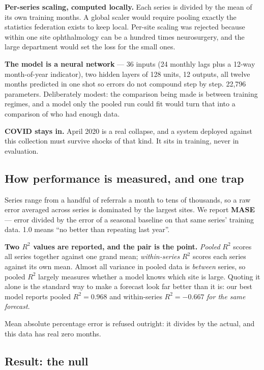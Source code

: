 \documentclass[11pt,a4paper]{article}
\newcommand{\keypoint}[1]{%
  \par\vspace{0.4em}%
  \noindent\colorbox{fed!8}{\parbox{0.98\textwidth}{\vspace{0.2em}#1\vspace{0.2em}}}%
  \par\vspace{0.4em}}
\begin{document}
\textbf{Per-series scaling, computed locally.} Each series is divided by the mean of its own training
months. A global scaler would require pooling exactly the statistics federation exists to keep local.
Per-site scaling was rejected because within one site ophthalmology can be a hundred times
neurosurgery, and the large department would set the loss for the small ones.

\textbf{The model is a neural network} --- 36 inputs (24 monthly lags plus a 12-way month-of-year
indicator), two hidden layers of 128 units, 12 outputs, all twelve months predicted in one shot so
errors do not compound step by step. 22{,}796 parameters. Deliberately modest: the comparison being
made is between training regimes, and a model only the pooled run could fit would turn that into a
comparison of who had enough data.

\textbf{COVID stays in.} April 2020 is a real collapse, and a system deployed against this collection
must survive shocks of that kind. It sits in training, never in evaluation.

\subsection{How performance is measured, and one trap}

Series range from a handful of referrals a month to tens of thousands, so a raw error averaged across
series is dominated by the largest sites. We report \textbf{MASE} --- error divided by the error of a
seasonal baseline on that same series' training data. 1.0 means ``no better than repeating last year''.

\keypoint{\textbf{Two $R^2$ values are reported, and the pair is the point.} \emph{Pooled} $R^2$ scores
all series together against one grand mean; \emph{within-series} $R^2$ scores each series against its
own mean. Almost all variance in pooled data is \emph{between} series, so pooled $R^2$ largely measures
whether a model knows which site is large. Quoting it alone is the standard way to make a forecast look
far better than it is: our best model reports pooled $R^2 = 0.968$ and within-series $R^2 = -0.667$
\emph{for the same forecast}.}

Mean absolute percentage error is refused outright: it divides by the actual, and this data has real
zero months.

\subsection{Result: the null}
\end{document}
